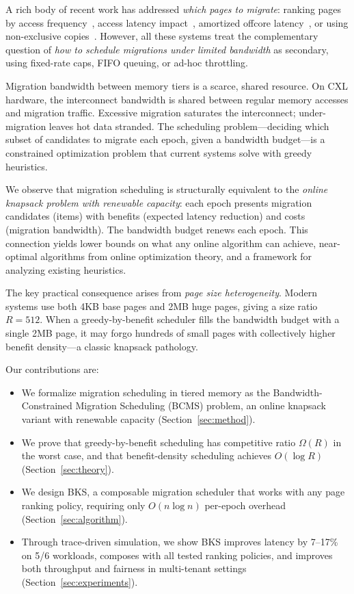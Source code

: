 \documentclass{article}
\begin{document}
A rich body of recent work has addressed \emph{which pages to migrate}: ranking pages by access frequency~\citep{tpp2023, memtis2023}, access latency impact~\citep{colloid2024}, amortized offcore latency~\citep{alto2025}, or using non-exclusive copies~\citep{nomad2024}. However, all these systems treat the complementary question of \emph{how to schedule migrations under limited bandwidth} as secondary, using fixed-rate caps, FIFO queuing, or ad-hoc throttling.

Migration bandwidth between memory tiers is a scarce, shared resource. On CXL hardware, the interconnect bandwidth is shared between regular memory accesses and migration traffic. Excessive migration saturates the interconnect; under-migration leaves hot data stranded. The scheduling problem---deciding which subset of candidates to migrate each epoch, given a bandwidth budget---is a constrained optimization problem that current systems solve with greedy heuristics.

We observe that migration scheduling is structurally equivalent to the \emph{online knapsack problem with renewable capacity}: each epoch presents migration candidates (items) with benefits (expected latency reduction) and costs (migration bandwidth). The bandwidth budget renews each epoch. This connection yields lower bounds on what any online algorithm can achieve, near-optimal algorithms from online optimization theory, and a framework for analyzing existing heuristics.

The key practical consequence arises from \emph{page size heterogeneity}. Modern systems use both 4KB base pages and 2MB huge pages, giving a size ratio $R = 512$. When a greedy-by-benefit scheduler fills the bandwidth budget with a single 2MB page, it may forgo hundreds of small pages with collectively higher benefit density---a classic knapsack pathology.

Our contributions are:
\begin{itemize}
    \item We formalize migration scheduling in tiered memory as the Bandwidth-Constrained Migration Scheduling (BCMS) problem, an online knapsack variant with renewable capacity (Section~\ref{sec:method}).
    \item We prove that greedy-by-benefit scheduling has competitive ratio $\Omega(R)$ in the worst case, and that benefit-density scheduling achieves $O(\log R)$ (Section~\ref{sec:theory}).
    \item We design BKS, a composable migration scheduler that works with any page ranking policy, requiring only $O(n \log n)$ per-epoch overhead (Section~\ref{sec:algorithm}).
    \item Through trace-driven simulation, we show BKS improves latency by 7--17\% on 5/6 workloads, composes with all tested ranking policies, and improves both throughput and fairness in multi-tenant settings (Section~\ref{sec:experiments}).
\end{itemize}
\end{document}
